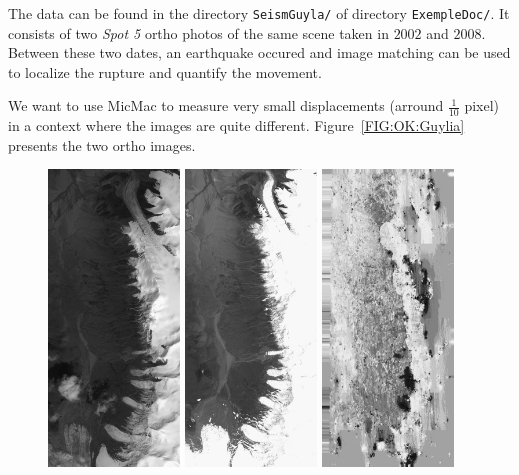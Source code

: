 The data can be found in the directory {\tt {SeismGuyla/}} 
 of directory {\tt ExempleDoc/}. %
It consists of  two \emph{Spot 5} ortho photos of the same scene taken in $2002$ and
$2008$. Between these two dates, an earthquake occured and image matching can be used to
localize the rupture and quantify the movement.

We want to use MicMac to measure very small displacements (arround $\frac{1}{10}$ pixel) in
a context where the images are quite different. Figure~\ref{FIG:OK:Guylia} presents the two
ortho images.

\begin{figure}
\begin{center}
\includegraphics[width=35mm]{FIGS/SeismGuylia/250802_ortho.jpg}
\includegraphics[width=35mm]{FIGS/SeismGuylia/260608_ortho.jpg}
\includegraphics[width=35mm]{FIGS/SeismGuylia/Px1.jpg}

\end{center}
\end{figure}
